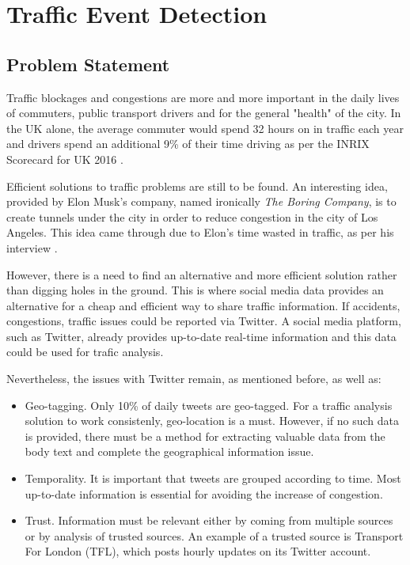 \documentclass[a4paper,portrait,12pt]{article}
\begin{document}
\section{Traffic Event Detection}
\subsection{Problem Statement}

Traffic blockages and congestions are more and more important in the daily lives of commuters, public transport drivers and for the general "health" of the city.
In the UK alone, the average commuter would spend 32 hours on in traffic each year and drivers spend an additional 9\% of their time driving as per the INRIX Scorecard for UK 2016 \cite{INRIXdata}. 

Efficient solutions to traffic problems are still to be found.
An interesting idea, provided by Elon Musk's company, named ironically \textit{The Boring Company}, is to create tunnels under the city in order to reduce congestion in the city of Los Angeles.
This idea came through due to Elon's time wasted in traffic, as per his interview \cite{ElonTED}.

However, there is a need to find an alternative and more efficient solution rather than digging holes in the ground.
This is where social media data provides an alternative for a cheap and efficient way to share traffic information.
If accidents, congestions, traffic issues could be reported via Twitter.
A social media platform, such as Twitter, already provides up-to-date real-time information and this data could be used for trafic analysis.

Nevertheless, the issues with Twitter remain, as mentioned before, as well as:
\begin{itemize}
	\item Geo-tagging. Only 10\% of daily tweets are geo-tagged. For a traffic analysis solution to work consistenly, geo-location is a must.
	However, if no such data is provided, there must be a method for extracting valuable data from the body text and complete the geographical information issue.
	\item Temporality. It is important that tweets are grouped according to time. 
	Most up-to-date information is essential for avoiding the increase of congestion.
	\item Trust. Information must be relevant either by coming from multiple sources or by analysis of trusted sources.
	An example of a trusted source is Transport For London (TFL), which posts hourly updates on its Twitter account.    
\end{itemize}
\end{document}
